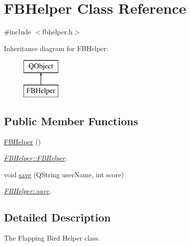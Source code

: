 \hypertarget{class_f_b_helper}{}\section{F\+B\+Helper Class Reference}
\label{class_f_b_helper}


{\ttfamily \#include $<$fbhelper.\+h$>$}

Inheritance diagram for F\+B\+Helper\+:\begin{figure}[H]
\begin{center}
\leavevmode
\includegraphics[height=2.000000cm]{class_f_b_helper}
\end{center}
\end{figure}
\subsection*{Public Member Functions}
\begin{DoxyCompactItemize}
\item 
\hypertarget{class_f_b_helper_a2cb5a6e986f1c155861d6327535ddadd}{}\hyperlink{class_f_b_helper_a2cb5a6e986f1c155861d6327535ddadd}{F\+B\+Helper} ()\label{class_f_b_helper_a2cb5a6e986f1c155861d6327535ddadd}

\begin{DoxyCompactList}\small\item\em \hyperlink{class_f_b_helper_a2cb5a6e986f1c155861d6327535ddadd}{F\+B\+Helper\+::\+F\+B\+Helper}. \end{DoxyCompactList}\item 
void \hyperlink{class_f_b_helper_afc18a55cac693f74248d2d3b9d4b2347}{save} (Q\+String user\+Name, int score)
\begin{DoxyCompactList}\small\item\em \hyperlink{class_f_b_helper_afc18a55cac693f74248d2d3b9d4b2347}{F\+B\+Helper\+::save}. \end{DoxyCompactList}\end{DoxyCompactItemize}


\subsection{Detailed Description}
The Flapping Bird Helper class. 

